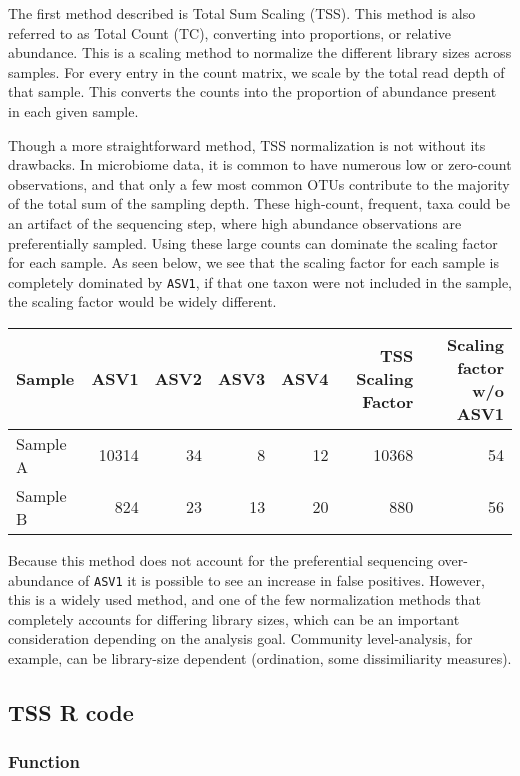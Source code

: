\documentclass[
]{book}
\begin{document}
The first method described is Total Sum Scaling (TSS). This method is also referred to as Total Count (TC), converting into proportions, or relative abundance. This is a scaling method to normalize the different library sizes across samples. For every entry in the count matrix, we scale by the total read depth of that sample. This converts the counts into the proportion of abundance present in each given sample.

Though a more straightforward method, TSS normalization is not without its drawbacks. In microbiome data, it is common to have numerous low or zero-count observations, and that only a few most common OTUs contribute to the majority of the total sum of the sampling depth. These high-count, frequent, taxa could be an artifact of the sequencing step, where high abundance observations are preferentially sampled. Using these large counts can dominate the scaling factor for each sample. As seen below, we see that the scaling factor for each sample is completely dominated by \texttt{ASV1}, if that one taxon were not included in the sample, the scaling factor would be widely different.

\begin{tabular}{l|r|r|r|r|r|r}
\hline
Sample & ASV1 & ASV2 & ASV3 & ASV4 & TSS Scaling Factor & Scaling factor w/o ASV1\\
\hline
Sample A & 10314 & 34 & 8 & 12 & 10368 & 54\\
\hline
Sample B & 824 & 23 & 13 & 20 & 880 & 56\\
\hline
\end{tabular}

Because this method does not account for the preferential sequencing over-abundance of \texttt{ASV1} it is possible to see an increase in false positives. However, this is a widely used method, and one of the few normalization methods that completely accounts for differing library sizes, which can be an important consideration depending on the analysis goal. Community level-analysis, for example, can be library-size dependent (ordination, some dissimiliarity measures).

\hypertarget{tss-r-code}{%
\subsection{TSS R code}\label{tss-r-code}}

\hypertarget{function}{%
\subsubsection{Function}\label{function}}
\end{document}
